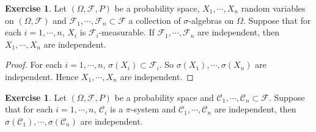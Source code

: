 \documentclass[12pt]{amsart}
\theoremstyle{definition}
\newtheorem{ex}[definition]{Exercise}
\newcommand{\sig}{\sigma}
\newcommand{\Om}{\Omega}
\newcommand{\MC}{\mathcal{C}}
\newcommand{\MF}{\mathcal{F}}
\begin{document}
	\begin{ex}
		Let $(\Om, \MF, P)$ be a probability space, $X_1, \cdots, X_n$ random variables on $(\Om, \MF)$ and $\MF_1, \cdots, \MF_n \subset \MF$ a collection of $\sig$-algebras on $\Om$. Suppose that for each $i = 1, \cdots, n$, $X_i$ is $\MF_i$-measurable. If $\MF_1, \cdots, \MF_n$ are independent, then $X_1, \cdots, X_n$ are independent. 
	\end{ex}
	
	\begin{proof}
		For each $i =1, \cdots, n$, $\sig(X_i) \subset \MF_i$. So $\sig(X_1), \cdots, \sig(X_n)$ are independent. Hence $X_1, \cdots, X_n$ are independent.
	\end{proof}
	
	\begin{ex}
		Let $(\Om, \MF, P)$ be a probability space and $\MC_1, \cdots, \MC_n \subset \MF$. Suppose that for each $i = 1, \cdots, n$, $\MC_i$ is a $\pi$-system and $\MC_1, \cdots, \MC_n$ are independent, then $\sig(\MC_1), \cdots, \sig(\MC_n)$ are independent.
	\end{ex}
	
\end{document}
